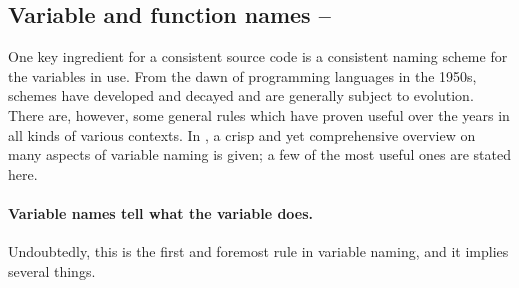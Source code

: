 %




\subsection{Variable and function names -- \cleansymbol\cleansymbol\cleansymbol}

One key ingredient for a consistent source code is a consistent naming scheme
for the variables in use. From the dawn of programming languages in the 1950s,
schemes have developed and decayed and are generally subject to evolution.
There are, however, some general rules which have proven useful over the years
in all kinds of various contexts. In \cite{Johnson:2002:MPS}, a crisp and yet
comprehensive overview on many aspects of variable naming is given; a few of
the most useful ones are stated here.

\paragraph{Variable names tell what the variable does.}
Undoubtedly, this is the first and foremost rule in variable naming, and it
implies several things.

